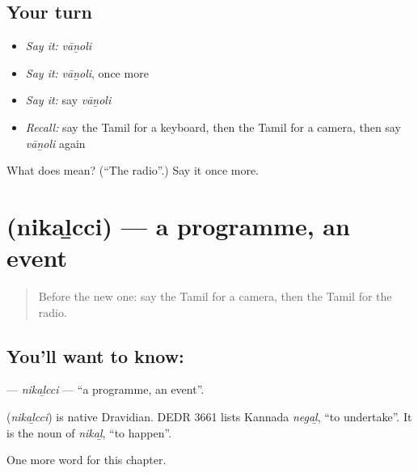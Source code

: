\subsection*{Your turn}
\begin{itemize}
\raggedright
  \item \emph{Say it:} \emph{vāṉoli}
  \item \emph{Say it:} \emph{vāṉoli}, once more
  \item \emph{Say it:} say \emph{vāṉoli}
  \item \emph{Recall:} say the Tamil for a keyboard, then the Tamil for a camera, then say \emph{vāṉoli} again
\end{itemize}

\begin{tcolorbox}[breakable,colback=teal!4,colframe=teal!35!black,title={Before you move on}]
What does  mean? (\textquotedblleft{}The radio\textquotedblright{}.) Say it once more.
\end{tcolorbox}
\section[\texorpdfstring{\ta{நிகழ்ச்சி} (nikaḻcci)}{நிகழ்ச்சி (nikaḻcci)}]{ (nikaḻcci) — a programme, an event}

\label{lesson:TA-C220-nikalcci}



\begin{quote}
Before the new one: say the Tamil for a camera, then the Tamil for the radio.
\end{quote}

\subsection*{You'll want to know: }
\textbf{} — \emph{nikaḻcci} — \textquotedblleft{}a programme, an event\textquotedblright{}.

\begin{cousinweb}
\textbf{} (\emph{nikaḻcci}) is native Dravidian. DEDR 3661 lists Kannada \emph{negaḻ}, \textquotedblleft{}to undertake\textquotedblright{}. It is the noun of \emph{nikaḻ}, \textquotedblleft{}to happen\textquotedblright{}.
\end{cousinweb}

\begin{grammarlens}[title={What you've built}]
One more word for this chapter.
\end{grammarlens}

